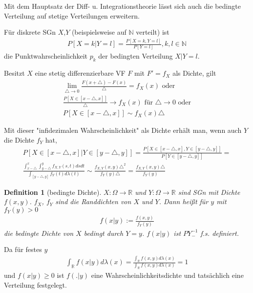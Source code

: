 \documentclass[]{article}
\newtheorem{definition}{Definition}
\begin{document}
Mit dem Hauptsatz der Diff- u. Integrationstheorie lässt sich auch die bedingte Verteilung auf stetige Verteilungen erweitern.

Für diskrete SGn $X$,$Y$ (beispielsweise auf $\mathbb{N}$ verteilt) ist
\begin{align*}
	P[X=k|Y=l] = \frac{P[X=k,Y=l]}{P[Y=l]}, k,l\in\mathbb{N}
\end{align*}
die Punktwahrscheinlichkeit $p_k$ der bedingten Verteilung $X|Y=l$.

Besitzt $X$ eine stetig differenzierbare VF $F$ mit $F'=f_X$ als Dichte, gilt
\begin{align*}
	\lim\limits_{\triangle\rightarrow0}\frac{F(x+\triangle)-F(x)}{\triangle} = f_X(x) \text{ oder}\\
	\frac{P[X\in[x-\triangle,x]]}{\triangle} \rightarrow f_X(x) \text{ für } \triangle\rightarrow0 \text{ oder}\\
	P[X\in[x-\triangle,x]] \sim f_X(x)\triangle
\end{align*}

Mit dieser "infidezimalen Wahrscheinlichkeit" als Dichte erhält man, wenn auch $Y$ die Dichte $f_Y$ hat,
\begin{align*}
	P[X\in[x-\triangle,x]|Y\in[y-\triangle,y]] = \frac{P[X\in[x-\triangle,x], Y\in[y-\triangle,y]]}{P[Y\in[y-\triangle,y]]} =\\
	\frac{\int_{x-\triangle}^{x}\int_{y-\triangle}^{y} f_{X,Y}(s,t) ds dt}{\int_{[y-\triangle,y]}f_Y(t) d\lambda(t)}\sim \frac{f_{X,Y}(x,y)\triangle^2}{f_Y(y)\triangle} = \frac{f_{X,Y}(x,y)\triangle}{f_Y(y)}
\end{align*}

\begin{definition}[bedingte Dichte]
	$X:\Omega\rightarrow\mathbb{R}$ und $Y:\Omega\rightarrow\mathbb{R}$ sind SGn mit Dichte $f(x,y)$. $f_X$, $f_Y$ sind die Randdichten von $X$ und $Y$. Dann heißt für $y$ mit $f_Y(y)>0$
	\begin{align*}
		f(x|y) := \frac{f(x,y)}{f_Y(y)}
	\end{align*}
	die bedingte Dichte von $X$ bedingt durch $Y=y$. $f(x|y)$ ist $PY^{-1}_-$ f.s. definiert.
\end{definition}

Da für festes $y$
\begin{align*}
	\int_\mathbb{R} f(x|y) d\lambda(x) = \frac{\int_\mathbb{R} f(x,y) d\lambda(x)}{\int_\mathbb{R} f(x,y) d\lambda(x)} = 1 
\end{align*}
und $f(x|y)\geq 0$ ist $f(.|y)$ eine Wahrscheinlichkeitsdichte und tatsächlich eine Verteilung festgelegt.
\end{document}
